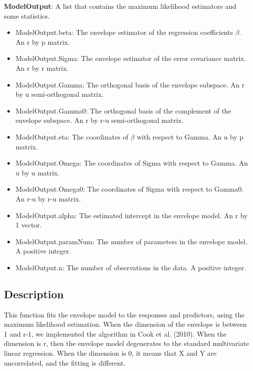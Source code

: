 \documentclass[a4paper,11pt,openany]{memoir}
\begin{document}
\begin{par}
\textbf{ModelOutput}: A list that contains the maximum likelihood estimators and some statistics.
\end{par} \vspace{1em}
\begin{itemize}
\setlength{\itemsep}{-1ex}
   \item ModelOutput.beta: The envelope estimator of the regression coefficients $\beta$. An r by p matrix.
   \item ModelOutput.Sigma: The envelope estimator of the error covariance matrix.  An r by r matrix.
   \item ModelOutput.Gamma: The orthogonal basis of the envelope subspace. An r by u semi-orthogonal matrix.
   \item ModelOutput.Gamma0: The orthogonal basis of the complement of the envelope subspace.  An r by r-u semi-orthogonal matrix.
   \item ModelOutput.eta: The coordinates of $\beta$ with respect to Gamma. An u by p matrix.
   \item ModelOutput.Omega: The coordinates of Sigma with respect to Gamma. An u by u matrix.
   \item ModelOutput.Omega0: The coordinates of Sigma with respect to Gamma0. An r-u by r-u matrix.
   \item ModelOutput.alpha: The estimated intercept in the envelope model.  An r by 1 vector.
   \item ModelOutput.paramNum: The number of parameters in the envelope model.  A positive integer.
   \item ModelOutput.n: The number of observations in the data.  A positive integer.
\end{itemize}


\subsection*{Description}

\begin{par}
This function fits the envelope model to the responses and predictors, using the maximum likelihood estimation.  When the dimension of the envelope is between 1 and r-1, we implemented the algorithm in Cook et al. (2010).  When the dimension is r, then the envelope model degenerates to the standard multivariate linear regression.  When the dimension is 0, it means that X and Y are uncorrelated, and the fitting is different.
\end{par} \vspace{1em}
\end{document}
